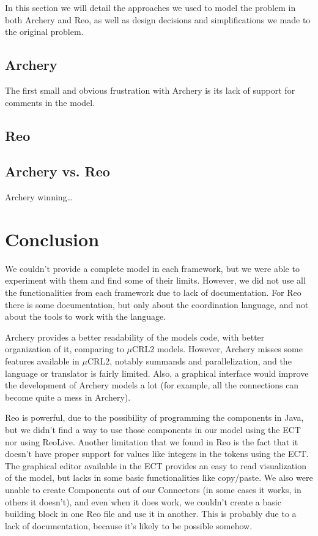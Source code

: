 \documentclass[a4paper]{article}
\newcommand{\ar}{Archery\xspace}
\newcommand{\re}{Reo\xspace}
\newcommand{\mcrl}{$\mu$CRL2\xspace}
\begin{document}
In this section we will detail the approaches we used to model the problem in
both \ar and \re, as well as design decisions and simplifications we made to the
original problem.



\subsection{\ar}

The first small and obvious frustration with \ar is its lack of support for
comments in the model.

\subsection{\re}


\subsection{\ar vs. \re}

\ar winning\dots

%
%
\section{Conclusion}
We couldn't provide a complete model in each framework, but we were able to
experiment with them and find some of their limits. However, we did not use all the
functionalities from each framework due to lack of documentation. For \re there
is some documentation, but only about the coordination language, and not about
the tools to work with the language.

\ar provides a better readability of the models code, with better organization
of it, comparing to \mcrl models. However, \ar misses some features available
in \mcrl, notably summands and parallelization, and the language or translator is
fairly limited. Also, a graphical interface would improve the development of
\ar models a lot (for example, all the connections can become quite a mess in
\ar).


\re is powerful, due to the possibility of programming the components in Java,
but we didn't find a way to use those components in our model using the ECT nor
using ReoLive. Another limitation that we found in \re is the fact that it
doesn't have proper support for values like integers in the tokens using the
ECT. The graphical editor available in the ECT provides an easy to read
visualization of the model, but lacks in some basic functionalities like
copy/paste. We also were unable to create Components out of our Connectors (in
some cases it works, in others it doesn't), and even when it does work, we
couldn't create a basic building block in one \re file and use it in another.
This is probably due to a lack of documentation, because it's likely to be
possible somehow.
\end{document}
